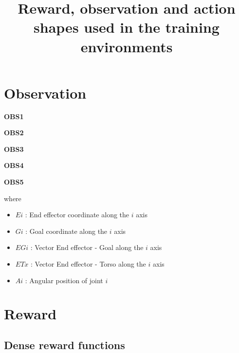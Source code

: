 \documentclass{article}
\title{Reward, observation and action shapes used in the training environments}
\date{}
\begin{document}
\maketitle


\section{Observation}

\textbf{OBS1} 
\begin{equation}
[Ex, Ey, Ez, A1, A2, A3, A4, A5, A6]
\end{equation}

\textbf{OBS2}
\begin{equation}
[Gx, Gy, Gz, A1, A2, A3, A4, A5, A6]
\end{equation}

\textbf{OBS3}
\begin{equation}
[ETx, ETy, ETz, EGx, EGy, EGz, A1, A2, A3, A4, A5, A6]
\end{equation}

\textbf{OBS4}
\begin{equation}
[EGx, EGy, EGz, A1, A2, A3, A4, A5, A6]
\end{equation}

\textbf{OBS5}
\begin{equation}
[ETx, ETy, ETz, EGx, EGy, EGz, Gx, Gy, Gz, A1, A2, A3, A4, A5, A6]
\end{equation}

where
\begin{itemize}  
\item $Ei$ : End effector coordinate along the $i$ axis
\item $Gi$ : Goal coordinate along the $i$ axis 
\item $EGi$ : Vector End effector - Goal along the $i$ axis 
\item $ETx$ : Vector End effector - Torso along the $i$ axis
\item $Ai$ : Angular position of joint $i$
\end{itemize}




\section{Reward}

\subsection{Dense reward functions}
\end{document}

